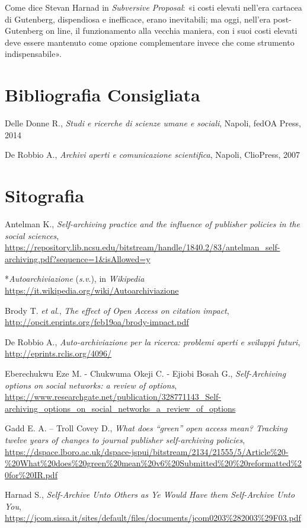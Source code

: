 {Come dice Stevan Harnad in \emph{Subversive} \emph{Proposal}: «i costi
elevati nell'era cartacea di Gutenberg, dispendiosa e inefficace, erano
inevitabili; ma oggi, nell'era post-Gutenberg on line, il funzionamento
alla vecchia maniera, con i suoi costi elevati deve essere mantenuto
come opzione complementare invece che come strumento indispensabile».

\section*{Bibliografia Consigliata}
{\parindent0pt 
Delle Donne R., \emph{Studi e ricerche di scienze umane e sociali},
Napoli, fedOA Press, 2014

De Robbio A., \emph{Archivi aperti e comunicazione scientifica}, Napoli,
ClioPress, 2007
}

\section*{Sitografia}
{\parindent0pt 
Antelman K., \emph{Self-archiving practice and the influence of
publisher policies in the social sciences},
\url{https://repository.lib.ncsu.edu/bitstream/handle/1840.2/83/antelman_self-archiving.pdf?sequence=1\&isAllowed=y}

*\emph{Autoarchiviazione} (\emph{s.v}.), in \emph{Wikipedia}
\url{https://it.wikipedia.org/wiki/Autoarchiviazione}

Brody T. \emph{et} \emph{al}., \emph{The effect of Open Access on
citation impact},
\url{http://opcit.eprints.org/feb19oa/brody-impact.pdf}

De Robbio A., \emph{Auto-archiviazione per la ricerca: problemi aperti e
sviluppi futuri},
\url{http://eprints.rclis.org/4096/}

Eberechukwu Eze M. - Chukwuma Okeji C. - Ejiobi Bosah G.,
\emph{Self-Archiving options on social networks: a review of options},
\url{https://www.researchgate.net/publication/328771143_Self-archiving_options_on_social_networks_a_review_of_options}

Gadd E. A. -- Troll Covey D., \emph{What does ``green'' open access
mean? Tracking twelve years of changes to journal publisher
self-archiving policies},
\url{https://dspace.lboro.ac.uk/dspace-jspui/bitstream/2134/21555/5/Article\%20-\%20What\%20does\%20green\%20mean\%20v6\%20Submitted\%20\%20reformatted\%20for\%20IR.pdf}

Harnad S., \emph{Self-Archive Unto Others as Ye Would Have them
Self-Archive Unto You}, 
\url{https://jcom.sissa.it/sites/default/files/documents/jcom0203\%282003\%29F03.pdf}

}}
